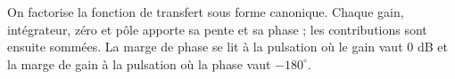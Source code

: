 \begin{corrigebox}[Corrigé]
On factorise la fonction de transfert sous forme canonique. Chaque gain, intégrateur, zéro et pôle apporte sa pente et sa phase ; les contributions sont ensuite sommées. La marge de phase se lit à la pulsation où le gain vaut $0$ dB et la marge de gain à la pulsation où la phase vaut $-180^\circ$.
\end{corrigebox}
